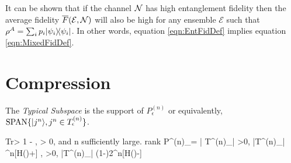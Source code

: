 \documentclass[aps,11pt,twoside,letterpaper]{article}
\def\Tr{\textup{Tr}}
\def\E{\mathcal{E}}
\begin{document}
			It can be shown \cite{EntFid} that if the channel ${\cal N}$ has high entanglement fidelity then the 
			average fidelity  $\bar{F}(\E, \cN)$ will also be high for any ensemble $\E$ such that 
			$\rho^A=\sum_i p_i | \psi_i \rangle\!\langle \psi_i |$.
			In other words, equation \eqref{eqn:EntFidDef} implies equation \eqref{eqn:MixedFidDef}.

					
			
			
			
			
			


\section{Compression}

The \emph{Typical Subspace} is the support of $P^{(n)}_\epsilon$ or equivalently, 
\mbox{$\textup{SPAN} \{ | j^n \rangle, j^n \in T^{(n)}_\epsilon  \}$}.

	\be 
		\Tr{} > 1 - \delta \qquad \forall \delta, \epsilon > 0, 
		\textrm{and } n \textrm{ sufficiently large.}  			
		\label{here_one}
	\ee
	\be
		\textup{rank} P^{(n)}_\epsilon = | T^{(n)}_\epsilon |
		\label{here_two}
	\ee
	\be
		\forall \epsilon >0, \quad |T^{(n)}_\epsilon| ^{n[H(\rho)+\epsilon]} 
		\label{here_three}
	\ee
	\be
		\forall \epsilon, \delta >0, \quad |T^{(n)}_\epsilon| \geq (1-\delta)2^{n[H(\rho)-\epsilon]} 
		\label{here_four}
	\ee
\end{document}
